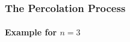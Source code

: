 \documentclass{beamer}
\begin{document}
	\begin{frame}
	    \frametitle{The Percolation Process}
		\framesubtitle{Example for $n=3$}
		\begin{center}

\end{center}
\end{frame}
\end{document}
